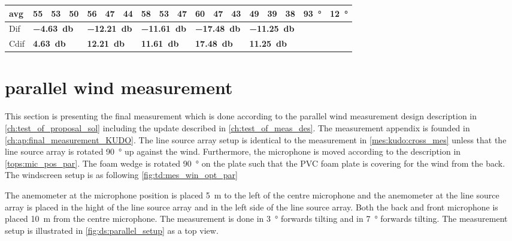 \begin{table}[H]
\begin{tabular}{l|l|l|l|l|l|l|l|l|l|l|l|l|l|l|l|l|l}
avg &  55    &  53    &  50    &  56    & 47     &  44    &   58   &  53     &  47    &  60     &   47   &  43    & 49 & 39  & 38  & \SI{93}{\degree} & \SI{12}{\degree} \\ \hline  
Dif & \multicolumn{3}{l|}{\textbf{\SI{-4.63}{\decibel}}} & \multicolumn{3}{l|}{\textbf{\SI{-12.21}{\decibel}}} & \multicolumn{3}{l|}{\textbf{\SI{-11.61}{\decibel}}} & \multicolumn{3}{l|}{\textbf{\SI{-17.48}{\decibel}}} & \multicolumn{3}{l|}{\textbf{\SI{-11.25}{\decibel}}}   &  \multicolumn{2}{l}{}    \\  \hline 
Cdif & \multicolumn{3}{l|}{\textbf{\SI{4.63}{\decibel}}} & \multicolumn{3}{l|}{\textbf{\SI{12.21}{\decibel}}} & \multicolumn{3}{l|}{\textbf{\SI{11.61}{\decibel}}} & \multicolumn{3}{l|}{\textbf{\SI{17.48}{\decibel}}} & \multicolumn{3}{l|}{\textbf{\SI{11.25}{\decibel}}}  &   \multicolumn{2}{l}{}                          
\end{tabular}
\label{meas:result_cross_7_8}
\end{table}




\section{parallel wind measurement}\label{mes:kudo:par_mes}
This section is presenting the final measurement which is done according to the parallel wind measurement design description in \autoref{ch:test_of_proposal_sol} including the update described in \autoref{ch:test_of_meas_des}. The measurement appendix is founded in \autoref{ch:ap:final_measurement_KUDO}. The line source array setup is identical to the measurement in \autoref{mes:kudo:cross_mes} unless that the line source array is rotated \SI{90}{\degree} up against the wind. Furthermore, the microphone is moved according to the description in \autoref{tops:mic_pos_par}. The foam wedge is rotated \SI{90}{\degree} on the plate such that the PVC foam plate is covering for the wind from the back. The windscreen setup is as following \autoref{fig:td:mes_win_opt_par}   



The anemometer at the microphone position is placed \SI{5}{\meter} to the left of the centre microphone and the anemometer at the line source array is placed in the hight of the line source array and in the left side of the line source array. Both the back and front microphone is placed \SI{10}{\meter} from the centre microphone. The measurement is done in \SI{3}{\degree} forwards tilting and in \SI{7}{\degree} forwards tilting. The measurement setup is illustrated in \autoref{fig:ds:parallel_setup} as a top view.

